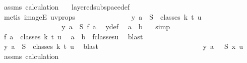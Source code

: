 \begin{isabellebody}
\ assms{\isacharparenleft}{\kern0pt}{}{\isacharparenright}{\kern0pt}\ calculation{\isacharparenleft}{\kern0pt}{}{\isacharcomma}{\kern0pt}\ {}{\isacharparenright}{\kern0pt}\ \isamarkupfalse%
\ layered{\isacharunderscore}{\kern0pt}subspace{\isacharunderscore}{\kern0pt}def\ \isanewline
\ \ \ \ \ \ \ \ \ \ \ \ \ \ \isamarkupfalse%
\ {\isacharparenleft}{\kern0pt}metis\ imageE\ uv{\isacharunderscore}{\kern0pt}props{\isacharparenright}{\kern0pt}\isanewline
\ \ \ \ \ \ \ \ \ \ \ \ \isamarkupfalse%
\ \isamarkupfalse%
\ {\isachardoublequoteopen}y\ a\ {\isasymin}\ S\ {\isacharbackquote}{\kern0pt}\ classes\ k\ t\ u{\isachardoublequoteclose}\ \isanewline
\ \ \ \ \ \ \ \ \ \ \ \ \isamarkupfalse%
\ {\isacharminus}{\kern0pt}\isanewline
\ \ \ \ \ \ \ \ \ \ \ \ \ \ \isamarkupfalse%
\ {\isachardoublequoteopen}y\ a\ {\isacharequal}{\kern0pt}\ S\ {\isacharparenleft}{\kern0pt}{\isacharquery}{\kern0pt}f\ a{\isacharparenright}{\kern0pt}{\isachardoublequoteclose}\ \isamarkupfalse%
\ y{\isacharunderscore}{\kern0pt}def\ \isamarkupfalse%
\ {\isacartoucheopen}a\ {\isacharless}{\kern0pt}\ b{\isacartoucheclose}\ {}\ \isamarkupfalse%
\ simp\isanewline
\ \ \ \ \ \ \ \ \ \ \ \ \ \ \isamarkupfalse%
\ \isamarkupfalse%
\ {\isachardoublequoteopen}{\isacharquery}{\kern0pt}f\ a\ {\isasymin}\ classes\ k\ t\ u{\isachardoublequoteclose}\ \isamarkupfalse%
\ {\isacartoucheopen}a\ {\isacharless}{\kern0pt}\ b{\isacartoucheclose}\ {}\ f{\isacharunderscore}{\kern0pt}classes{\isacharunderscore}{\kern0pt}u\ \isamarkupfalse%
\ blast\isanewline
\ \ \ \ \ \ \ \ \ \ \ \ \ \ \isamarkupfalse%
\ \isamarkupfalse%
\ {\isachardoublequoteopen}y\ a\ {\isasymin}\ S\ {\isacharbackquote}{\kern0pt}\ classes\ k\ t\ u{\isachardoublequoteclose}\ \isamarkupfalse%
\ blast\isanewline
\ \ \ \ \ \ \ \ \ \ \ \ \isamarkupfalse%
\isanewline
\ \ \ \ \ \ \ \ \ \ \ \ \isamarkupfalse%
\ \isamarkupfalse%
\ {\isachardoublequoteopen}{\isasymchi}\ {\isacharparenleft}{\kern0pt}y\ a{\isacharparenright}{\kern0pt}\ {\isacharequal}{\kern0pt}\ {\isasymchi}\ {\isacharparenleft}{\kern0pt}S\ {\isacharparenleft}{\kern0pt}x\ u{\isacharparenright}{\kern0pt}{\isacharparenright}{\kern0pt}{\isachardoublequoteclose}\ \isamarkupfalse%
\ assms{\isacharparenleft}{\kern0pt}{}{\isacharparenright}{\kern0pt}\ calculation{\isacharparenleft}{\kern0pt}{}{\isacharcomma}{\kern0pt}\ {}{\isacharparenright}{\kern0pt}\ \isamarkupfalse%

\end{isabellebody}
